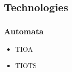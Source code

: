 \subsection{Technologies} %


\subsubsection{Automata}\label{subsub:automata}




\begin{itemize}
    \item TIOA
    \item TIOTS
\end{itemize}

